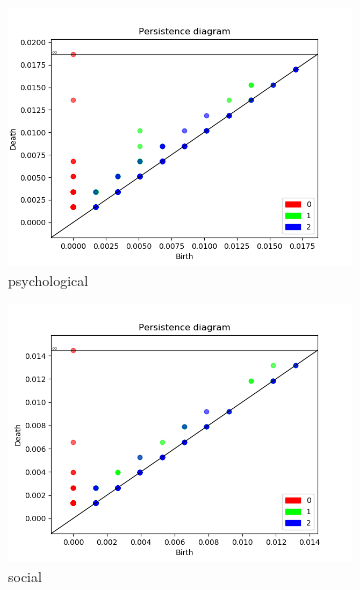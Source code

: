 \documentclass[fleqn]{article}
\begin{document}
\begin{figure}
\begin{subfigure}[t]{0.425\textwidth}
			\includegraphics[width=\textwidth]{figures/stopwords_excluded/psychological.png}
			\caption{psychological}
			\label{fig:sw:psychological}
		\end{subfigure}\hfill
		\begin{subfigure}[t]{0.425\textwidth}
			\includegraphics[width=\textwidth]{figures/stopwords_excluded/social.png}
			\caption{social}
			\label{fig:sw:social}
		\end{subfigure}\hfill
		\\
		\begin{subfigure}[t]{0.425\textwidth}

\end{subfigure}
\end{figure}
\end{document}
